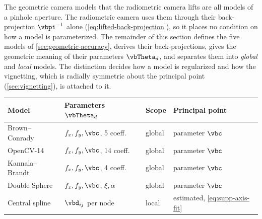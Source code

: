 The geometric camera models that the radiometric camera lifts are all
models of a pinhole aperture. The radiometric camera uses them through
their back-projection $\vbpi^{-1}$ alone
(\cref{eq:lifted-back-projection}), so it places no condition on how a
model is parameterized. The remainder of this section defines the five
models of \cref{sec:geometric-accuracy}, derives their
back-projections, gives the geometric meaning of their parameters
$\vbTheta_d$, and separates them into \emph{global} and \emph{local}
models. The distinction decides how a model is regularized and how the
vignetting, which is radially symmetric about the principal point
(\cref{sec:vignetting}), is attached to it.
\begin{center}
  \footnotesize\setlength{\tabcolsep}{3pt}
  \begin{tabular*}{\linewidth}{@{\extracolsep{\fill}}llll@{}}
    \toprule
    \textbf{Model} & \textbf{Parameters} $\vbTheta_d$ & \textbf{Scope} & \textbf{Principal point} \\
    \midrule
    Brown--Conrady & $f_x,f_y,\vbc$, 5 coeff. & global & parameter $\vbc$ \\
    OpenCV-14 & $f_x,f_y,\vbc$, 14 coeff. & global & parameter $\vbc$ \\
    Kannala--Brandt & $f_x,f_y,\vbc$, 4 coeff. & global & parameter $\vbc$ \\
    Double Sphere & $f_x,f_y,\vbc$, $\xi,\alpha$ & global & parameter $\vbc$ \\
    Central spline & $\vbd_{ij}$ per node & local & estimated, \cref{eq:supp-axis-fit} \\
    \bottomrule
  \end{tabular*}
\end{center}

